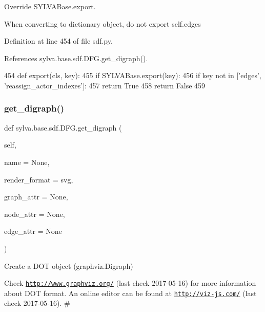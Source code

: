 Override S\+Y\+L\+V\+A\+Base.\+export. 

When converting to dictionary object, do not export self.\+edges 

Definition at line 454 of file sdf.\+py.



References sylva.\+base.\+sdf.\+D\+F\+G.\+get\+\_\+digraph().


\begin{DoxyCode}
454     \textcolor{keyword}{def }export(cls, key):
455         \textcolor{keywordflow}{if} SYLVABase.export(key):
456             \textcolor{keywordflow}{if} key \textcolor{keywordflow}{not} \textcolor{keywordflow}{in} [\textcolor{stringliteral}{'edges'}, \textcolor{stringliteral}{'reassign\_actor\_indexes'}]:
457                 \textcolor{keywordflow}{return} \textcolor{keyword}{True}
458         \textcolor{keywordflow}{return} \textcolor{keyword}{False}
459 
\end{DoxyCode}
\mbox{\label{classsylva_1_1base_1_1sdf_1_1_d_f_g_ab910b4ff0e171dcc46ea65cf790699cc}} 
\subsubsection{\texorpdfstring{get\+\_\+digraph()}{get\_digraph()}}
{\footnotesize\ttfamily def sylva.\+base.\+sdf.\+D\+F\+G.\+get\+\_\+digraph (\begin{DoxyParamCaption}\item[{}]{self,  }\item[{}]{name = {\ttfamily None},  }\item[{}]{render\+\_\+format = {\ttfamily \textquotesingle{}svg\textquotesingle{}},  }\item[{}]{graph\+\_\+attr = {\ttfamily None},  }\item[{}]{node\+\_\+attr = {\ttfamily None},  }\item[{}]{edge\+\_\+attr = {\ttfamily None} }\end{DoxyParamCaption})}



Create a D\+OT object (graphviz.\+Digraph) 

Check \href{http://www.graphviz.org/}{\tt http\+://www.\+graphviz.\+org/} (last check 2017-\/05-\/16) for more information about D\+OT format. An online editor can be found at \href{http://viz-js.com/}{\tt http\+://viz-\/js.\+com/} (last check 2017-\/05-\/16). \#


